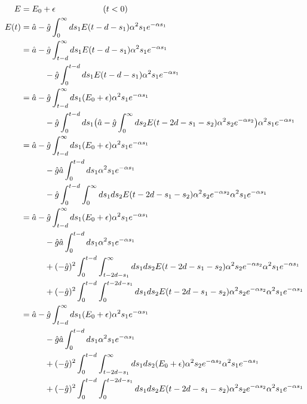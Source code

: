 \begin{align}
	E &= E_0 + \epsilon \hspace{2cm} (t<0) \\
	E(t) &= \hat{a} - \hat{g} \int_{0}^{\infty} ds_1 E(t - d - s_1) \alpha^2 s_1 e^{-\alpha s_1} \\
	&= \hat{a} - \hat{g} \int_{t - d}^{\infty} ds_1 E(t - d - s_1) \alpha^2 s_1 e^{-\alpha s_1} \\
	&\hspace{1 cm} - \hat{g} \int_{0}^{t - d} ds_1 E(t - d - s_1) \alpha^2 s_1 e^{-\alpha s_1} \\
	&= \hat{a} - \hat{g} \int_{t - d}^{\infty} ds_1 ( E_0 + \epsilon ) \alpha^2 s_1 e^{-\alpha s_1}\\
	& \hspace{1 cm} - \hat{g} \int_{0}^{t - d} ds_1 \big( \hat{a} - \hat{g} \int_{0}^{\infty} ds_2 E(t - 2d - s_1 - s_2) \alpha^2 s_2 e^{-\alpha s_2} \big) \alpha^2 s_1 e^{-\alpha s_1} \\
	&= \hat{a} - \hat{g} \int_{t - d}^{\infty} ds_1 ( E_0 + \epsilon ) \alpha^2 s_1 e^{-\alpha s_1}\\
	& \hspace{1 cm} - \hat{g} \hat{a} \int_{0}^{t - d} ds_1 \alpha^2 s_1 e^{-\alpha s_1}\\
	& \hspace{1 cm} - \hat{g} \int_{0}^{t - d} \int_{0}^{\infty} ds_1 ds_2 E(t - 2d - s_1 - s_2) \alpha^2 s_2 e^{-\alpha s_2} \alpha^2 s_1 e^{-\alpha s_1} \\
	&= \hat{a} - \hat{g} \int_{t - d}^{\infty} ds_1 ( E_0 + \epsilon ) \alpha^2 s_1 e^{-\alpha s_1}\\
	& \hspace{1 cm} - \hat{g} \hat{a} \int_{0}^{t - d} ds_1 \alpha^2 s_1 e^{-\alpha s_1}\\
	& \hspace{1 cm} + (-\hat{g})^2 \int_{0}^{t-d} \int_{t - 2d - s_1}^{\infty} ds_1 ds_2 E(t - 2d - s_1 - s_2) \alpha^2 s_2 e^{-\alpha s_2} \alpha^2 s_1 e^{-\alpha s_1} \\
	& \hspace{1 cm} + (-\hat{g})^2 \int_{0}^{t - d} \int_{0}^{t - 2d - s_1} ds_1 ds_2 E(t - 2d - s_1 - s_2) \alpha^2 s_2 e^{-\alpha s_2} \alpha^2 s_1 e^{-\alpha s_1} \\
	&= \hat{a} - \hat{g} \int_{t - d}^{\infty} ds_1 ( E_0 + \epsilon ) \alpha^2 s_1 e^{-\alpha s_1}\\
	& \hspace{1 cm} - \hat{g} \hat{a} \int_{0}^{t - d} ds_1 \alpha^2 s_1 e^{-\alpha s_1}\\
	& \hspace{1 cm} +(-\hat{g})^2 \int_{0}^{t-d} \int_{t - 2d - s_1}^{\infty} ds_1 ds_2 (E_0 + \epsilon) \alpha^2 s_2 e^{-\alpha s_2} \alpha^2 s_1 e^{-\alpha s_1} \\
	& \hspace{1 cm} +(-\hat{g})^2 \int_{0}^{t - d} \int_{0}^{t - 2d - s_1} ds_1 ds_2 E(t - 2d - s_1 - s_2) \alpha^2 s_2 e^{-\alpha s_2} \alpha^2 s_1 e^{-\alpha s_1}
\end{align}

